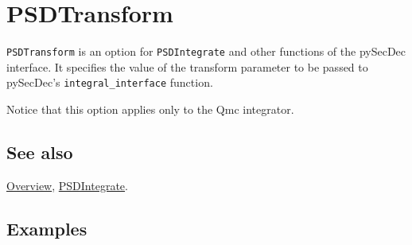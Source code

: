 \documentclass[../FeynHelpersManual.tex]{subfiles}
\begin{document}
\hypertarget{psdtransform}{
\section{PSDTransform}\label{psdtransform}}

\texttt{PSDTransform} is an option for \texttt{PSDIntegrate} and other
functions of the pySecDec interface. It specifies the value of the
transform parameter to be passed to pySecDec's
\texttt{integral_interface} function.

Notice that this option applies only to the Qmc integrator.

\subsection{See also}

\hyperlink{toc}{Overview}, \hyperlink{psdintegrate}{PSDIntegrate}.

\subsection{Examples}
\end{document}

